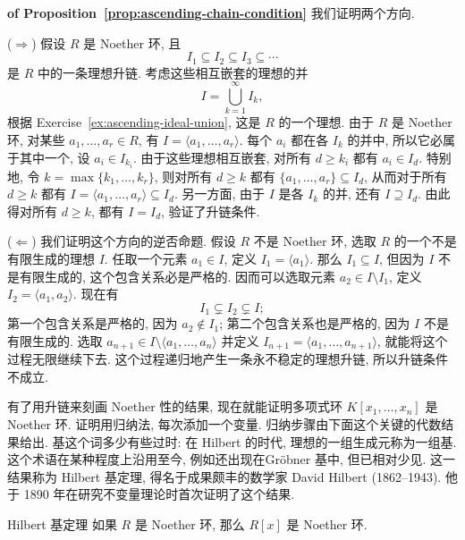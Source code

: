 \begin{Proof}\unskip\textbf{ of Proposition~\ref{prop:ascending-chain-condition}}\quad
  我们证明两个方向.

  ($\Rightarrow$) 假设 $R$ 是 Noether 环, 且
  \[
    I_{1}\subseteq I_{2}\subseteq I_{3}\subseteq\cdots
  \]
  是 $R$ 中的一条理想升链. 考虑这些相互嵌套的理想的并
  \[
    I=\bigcup_{k=1}^{\infty}I_{k},
  \]
  根据 Exercise~\ref{ex:ascending-ideal-union}, 这是 $R$ 的一个理想. 由于 $R$ 是 Noether 环, 对某些 $a_{1},\ldots,a_{r}\in R$, 有 $I=\langle a_{1},\ldots,a_{r}\rangle$. 每个 $a_{i}$ 都在各 $I_{k}$ 的并中, 所以它必属于其中一个, 设 $a_{i}\in I_{k_{i}}$. 由于这些理想相互嵌套, 对所有 $d\geq k_{i}$ 都有 $a_{i}\in I_{d}$. 特别地, 令 $k=\max\{k_{1},\ldots,k_{r}\}$, 则对所有 $d\geq k$ 都有 $\{a_{1},\ldots,a_{r}\}\subseteq I_{d}$, 从而对于所有 $d\geq k$ 都有 $I=\langle a_{1},\ldots,a_{r}\rangle\subseteq I_{d}$. 另一方面, 由于 $I$ 是各 $I_{k}$ 的并, 还有 $I\supseteq I_{d}$. 由此得对所有 $d\geq k$, 都有 $I=I_{d}$, 验证了升链条件.

  ($\Leftarrow$) 我们证明这个方向的逆否命题. 假设 $R$ 不是 Noether 环, 选取 $R$ 的一个不是有限生成的理想 $I$. 任取一个元素 $a_{1}\in I$, 定义 $I_{1}=\langle a_{1}\rangle$. 那么 $I_{1}\subseteq I$, 但因为 $I$ 不是有限生成的, 这个包含关系必是严格的. 因而可以选取元素 $a_{2}\in I\setminus I_{1}$, 定义 $I_{2}=\langle a_{1},a_{2}\rangle$. 现在有
  \[
    I_{1}\subsetneq I_{2}\subsetneq I;
  \]
  第一个包含关系是严格的, 因为 $a_{2}\notin I_{1}$; 第二个包含关系也是严格的, 因为 $I$ 不是有限生成的. 选取 $a_{n+1}\in I\setminus\langle a_{1},\ldots,a_{n}\rangle$ 并定义 $I_{n+1}=\langle a_{1},\ldots,a_{n+1}\rangle$, 就能将这个过程无限继续下去. 这个过程递归地产生一条永不稳定的理想升链, 所以升链条件不成立.
\end{Proof}

\BookPairedNote
  {有了用升链来刻画 Noether 性的结果, 现在就能证明多项式环 $K[x_{1},\ldots,x_{n}]$ 是 Noether 环. 证明用归纳法, 每次添加一个变量. 归纳步骤由下面这个关键的代数结果给出.}
  {\textquotedbl{}基\textquotedbl{}这个词多少有些过时: 在 Hilbert 的时代, 理想的一组生成元称为一组基. 这个术语在某种程度上沿用至今, 例如还出现在\textquotedbl{}Gröbner 基\textquotedbl{}中, 但已相对少见.}
\noindent 这一结果称为 Hilbert 基定理, 得名于成果颇丰的数学家 David Hilbert (1862--1943). 他于 1890 年在研究不变量理论时首次证明了这个结果.

\begin{Theorem}{Hilbert 基定理}\leavevmode\label{thm:hilbert-basis-theorem}
  如果 $R$ 是 Noether 环, 那么 $R[x]$ 是 Noether 环.
\end{Theorem}

